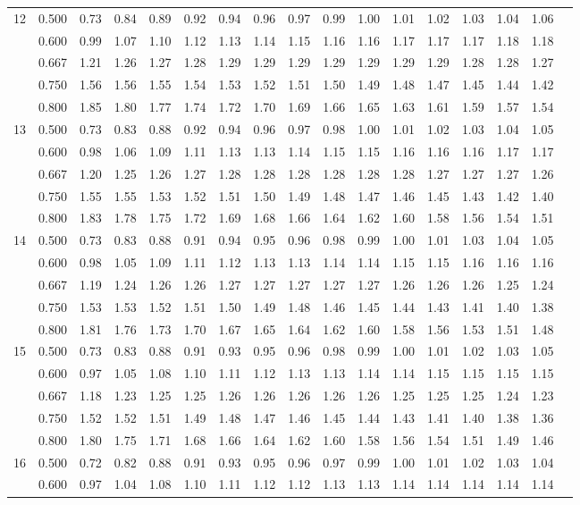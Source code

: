 \documentclass[pdftex,11pt,openany]{book}\usepackage[]{graphicx}\usepackage[]{color}
\begin{document}
{\begin{center}
\begin{tabular}{rrr@{\,}r@{\,}r@{\,}r@{\,}r@{\,}r@{\,}r@{\,}r
                   @{\,}r@{\,}r@{\,}r@{\,}r@{\,}r@{\,}r@{\,}r}
12&0.500&0.73&0.84&0.89&0.92&0.94&0.96&0.97&0.99&1.00&1.01&1.02&1.03&1.04&1.06\\
  &0.600&0.99&1.07&1.10&1.12&1.13&1.14&1.15&1.16&1.16&1.17&1.17&1.17&1.18&1.18\\
  &0.667&1.21&1.26&1.27&1.28&1.29&1.29&1.29&1.29&1.29&1.29&1.29&1.28&1.28&1.27\\
  &0.750&1.56&1.56&1.55&1.54&1.53&1.52&1.51&1.50&1.49&1.48&1.47&1.45&1.44&1.42\\
  &0.800&1.85&1.80&1.77&1.74&1.72&1.70&1.69&1.66&1.65&1.63&1.61&1.59&1.57&1.54\\
13&0.500&0.73&0.83&0.88&0.92&0.94&0.96&0.97&0.98&1.00&1.01&1.02&1.03&1.04&1.05\\
  &0.600&0.98&1.06&1.09&1.11&1.13&1.13&1.14&1.15&1.15&1.16&1.16&1.16&1.17&1.17\\
  &0.667&1.20&1.25&1.26&1.27&1.28&1.28&1.28&1.28&1.28&1.28&1.27&1.27&1.27&1.26\\
  &0.750&1.55&1.55&1.53&1.52&1.51&1.50&1.49&1.48&1.47&1.46&1.45&1.43&1.42&1.40\\
  &0.800&1.83&1.78&1.75&1.72&1.69&1.68&1.66&1.64&1.62&1.60&1.58&1.56&1.54&1.51\\
14&0.500&0.73&0.83&0.88&0.91&0.94&0.95&0.96&0.98&0.99&1.00&1.01&1.03&1.04&1.05\\
  &0.600&0.98&1.05&1.09&1.11&1.12&1.13&1.13&1.14&1.14&1.15&1.15&1.16&1.16&1.16\\
  &0.667&1.19&1.24&1.26&1.26&1.27&1.27&1.27&1.27&1.27&1.26&1.26&1.26&1.25&1.24\\
  &0.750&1.53&1.53&1.52&1.51&1.50&1.49&1.48&1.46&1.45&1.44&1.43&1.41&1.40&1.38\\
  &0.800&1.81&1.76&1.73&1.70&1.67&1.65&1.64&1.62&1.60&1.58&1.56&1.53&1.51&1.48\\
15&0.500&0.73&0.83&0.88&0.91&0.93&0.95&0.96&0.98&0.99&1.00&1.01&1.02&1.03&1.05\\
  &0.600&0.97&1.05&1.08&1.10&1.11&1.12&1.13&1.13&1.14&1.14&1.15&1.15&1.15&1.15\\
  &0.667&1.18&1.23&1.25&1.25&1.26&1.26&1.26&1.26&1.26&1.25&1.25&1.25&1.24&1.23\\
  &0.750&1.52&1.52&1.51&1.49&1.48&1.47&1.46&1.45&1.44&1.43&1.41&1.40&1.38&1.36\\
  &0.800&1.80&1.75&1.71&1.68&1.66&1.64&1.62&1.60&1.58&1.56&1.54&1.51&1.49&1.46\\
16&0.500&0.72&0.82&0.88&0.91&0.93&0.95&0.96&0.97&0.99&1.00&1.01&1.02&1.03&1.04\\
  &0.600&0.97&1.04&1.08&1.10&1.11&1.12&1.12&1.13&1.13&1.14&1.14&1.14&1.14&1.14\\

\end{tabular}
\end{center}}
\end{document}
